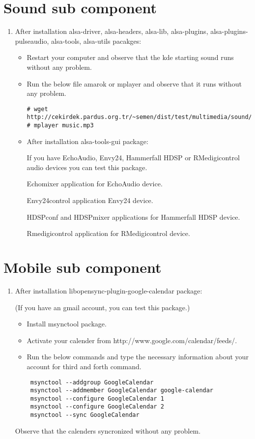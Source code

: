 \documentclass[a4paper,10pt]{article}
\begin{document}
\section{Sound sub component}
\begin{enumerate}
 \item After installation alsa-driver, alsa-headers, alsa-lib, alsa-plugins, alsa-plugins-pulseaudio, alsa-tools, alsa-utils pacakges:
\begin{itemize}
 \item Restart your computer and observe that the kde starting sound runs without any problem.
 \item Run the below file amarok or mplayer and observe that it runs without any problem.
\begin{verbatim}
# wget http://cekirdek.pardus.org.tr/~semen/dist/test/multimedia/sound/sound/music.mp3
# mplayer music.mp3
\end{verbatim}

\item After installation alsa-tools-gui package:

If you have EchoAudio, Envy24, Hammerfall HDSP or RMedigicontrol audio devices you can test this package.

Echomixer application for EchoAudio device.

Envy24control application Envy24 device.

HDSPconf and HDSPmixer applications for Hammerfall HDSP device.

Rmedigicontrol application for RMedigicontrol device.
\end{itemize}

\end{enumerate}
\section{Mobile sub component}
\begin{enumerate}
 \item After installation libopensync-plugin-google-calendar package:

(If you have an gmail account, you can test this package.)
\begin{itemize}
 \item Install msynctool package.
 \item Activate your calender from http://www.google.com/calendar/feeds/.
 \item Run the below commands and type the necessary information about your account for third and forth command.

\begin{verbatim}
 msynctool --addgroup GoogleCalendar
 msynctool --addmember GoogleCalendar google-calendar
 msynctool --configure GoogleCalendar 1
 msynctool --configure GoogleCalendar 2
 msynctool --sync GoogleCalendar	
\end{verbatim}

\end{itemize}

Observe that the calenders syncronized without any problem.
\end{enumerate}
\end{document}
